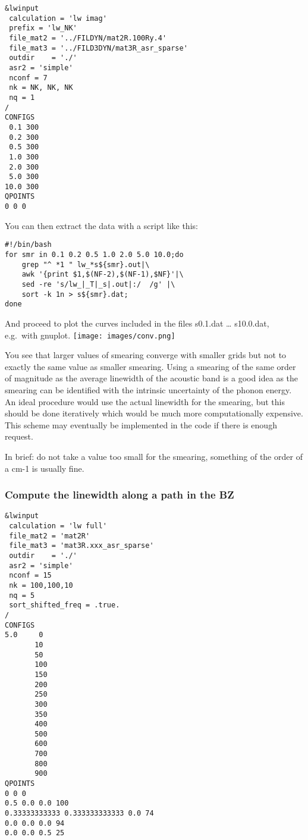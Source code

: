 \documentclass[
]{article}
\begin{document}
\begin{verbatim}
&lwinput 
 calculation = 'lw imag' 
 prefix = 'lw_NK' 
 file_mat2 = '../FILDYN/mat2R.100Ry.4' 
 file_mat3 = '../FILD3DYN/mat3R_asr_sparse' 
 outdir    = './' 
 asr2 = 'simple'  
 nconf = 7
 nk = NK, NK, NK
 nq = 1
/ 
CONFIGS 
 0.1 300
 0.2 300
 0.5 300
 1.0 300
 2.0 300
 5.0 300
10.0 300
QPOINTS 
0 0 0
\end{verbatim}

You can then extract the data with a script like this:

\begin{verbatim}
#!/bin/bash
for smr in 0.1 0.2 0.5 1.0 2.0 5.0 10.0;do
    grep "^ *1 " lw_*s${smr}.out|\
    awk '{print $1,$(NF-2),$(NF-1),$NF}'|\
    sed -re 's/lw_|_T|_s|.out|:/  /g' |\
    sort -k 1n > s${smr}.dat;
done 
\end{verbatim}

And proceed to plot the curves included in the files s0.1.dat \ldots{}
s10.0.dat, e.g.~with gnuplot.
\texttt{[image: images/conv.png]}

You see that larger values of smearing converge with smaller grids but
not to exactly the same value as smaller smearing. Using a smearing of
the same order of magnitude as the average linewidth of the acoustic
band is a good idea as the smearing can be identified with the intrinsic
uncertainty of the phonon energy. An ideal procedure would use the
actual linewidth for the smearing, but this should be done iteratively
which would be much more computationally expensive. This scheme may
eventually be implemented in the code if there is enough request.

In brief: do not take a value too small for the smearing, something of
the order of a cm-1 is usually fine.

\hypertarget{compute-the-linewidth-along-a-path-in-the-bz}{%
\subsubsection{Compute the linewidth along a path in the
BZ}\label{compute-the-linewidth-along-a-path-in-the-bz}}

\begin{verbatim}
&lwinput 
 calculation = 'lw full'
 file_mat2 = 'mat2R' 
 file_mat3 = 'mat3R.xxx_asr_sparse' 
 outdir    = './' 
 asr2 = 'simple' 
 nconf = 15 
 nk = 100,100,10 
 nq = 5 
 sort_shifted_freq = .true. 
/ 
CONFIGS 
5.0     0 
       10 
       50 
       100 
       150 
       200 
       250 
       300 
       350 
       400 
       500 
       600 
       700 
       800 
       900 
QPOINTS 
0 0 0 
0.5 0.0 0.0 100 
0.33333333333 0.333333333333 0.0 74 
0.0 0.0 0.0 94 
0.0 0.0 0.5 25
\end{verbatim}
\end{document}
